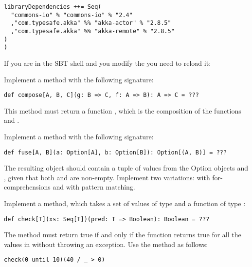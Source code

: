 \documentclass[11pt]{article}
\begin{document}
\begin{myExercise}
\begin{lstlisting}
libraryDependencies ++= Seq(
  "commons-io" % "commons-io" % "2.4"
  ,"com.typesafe.akka" %% "akka-actor" % "2.8.5"
  ,"com.typesafe.akka" %% "akka-remote" % "2.8.5"
)
)
\end{lstlisting}
If you are in the SBT shell and you modify the  you need to reload it:
\\

\end{myExercise}

\begin{myExercise}
Implement a  method with the following signature:
\begin{lstlisting}
def compose[A, B, C](g: B => C, f: A => B): A => C = ???
\end{lstlisting}
This method must return a function , which is the composition of the
functions  and .
\end{myExercise}

\begin{myExercise}
Implement a  method with the following signature:
\begin{lstlisting}
def fuse[A, B](a: Option[A], b: Option[B]): Option[(A, B)] = ???
\end{lstlisting}
The resulting  object should contain a tuple of values from the Option objects  and , given that both  and  are non-empty. Implement two variations: with for-comprehensions and with pattern matching.
\end{myExercise}

\begin{myExercise}
Implement a  method, which takes a set of values of type  and a function of type :
\begin{lstlisting}
def check[T](xs: Seq[T])(pred: T => Boolean): Boolean = ???
\end{lstlisting}
The method must return true if and only if the  function returns true for all the values in  without throwing an exception. Use the  method as follows:
\begin{lstlisting}
check(0 until 10)(40 / _ > 0)
\end{lstlisting}
\end{myExercise}
\end{document}
